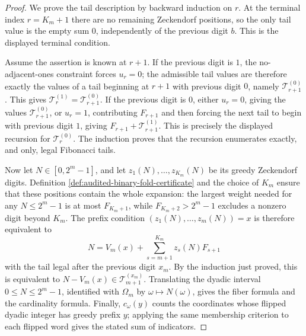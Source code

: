 \begin{proof}
We prove the tail description by backward induction on \(r\).  At the terminal index \(r=K_m+1\) there are no remaining Zeckendorf positions, so the only tail value is the empty sum \(0\), independently of the previous digit \(b\).  This is the displayed terminal condition.

Assume the assertion is known at \(r+1\).  If the previous digit is \(1\), the no-adjacent-ones constraint forces \(u_r=0\); the admissible tail values are therefore exactly the values of a tail beginning at \(r+1\) with previous digit \(0\), namely \(\mathcal T_{r+1}^{(0)}\).  This gives \(\mathcal T_r^{(1)}=\mathcal T_{r+1}^{(0)}\).  If the previous digit is \(0\), either \(u_r=0\), giving the values \(\mathcal T_{r+1}^{(0)}\), or \(u_r=1\), contributing \(F_{r+1}\) and then forcing the next tail to begin with previous digit \(1\), giving \(F_{r+1}+\mathcal T_{r+1}^{(1)}\).  This is precisely the displayed recursion for \(\mathcal T_r^{(0)}\).  The induction proves that the recursion enumerates exactly, and only, legal Fibonacci tails.

Now let \(N\in[0,2^m-1]\), and let \(z_1(N),\ldots,z_{K_m}(N)\) be its greedy Zeckendorf digits.  Definition \ref{def:audited-binary-fold-certificate} and the choice of \(K_m\) ensure that these positions contain the whole expansion: the largest weight needed for any \(N\le2^m-1\) is at most \(F_{K_m+1}\), while \(F_{K_m+2}>2^m-1\) excludes a nonzero digit beyond \(K_m\).  The prefix condition \((z_1(N),\ldots,z_m(N))=x\) is therefore equivalent to
\[
N=V_m(x)+\sum_{s=m+1}^{K_m}z_s(N)F_{s+1}
\]
with the tail legal after the previous digit \(x_m\).  By the induction just proved, this is equivalent to \(N-V_m(x)\in\mathcal T_{m+1}^{(x_m)}\).  Translating the dyadic interval \(0\le N\le2^m-1\), identified with \(\Omega_m\) by \(\omega\mapsto N(\omega)\), gives the fiber formula and the cardinality formula.  Finally, \(c_\omega(y)\) counts the coordinates whose flipped dyadic integer has greedy prefix \(y\); applying the same membership criterion to each flipped word gives the stated sum of indicators. \qedhere
\end{proof}

